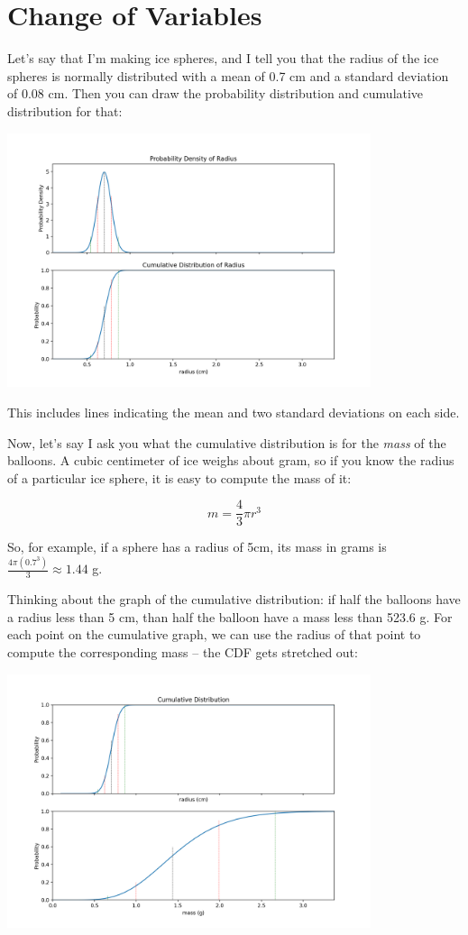 \chapter{Change of Variables}

Let's say that I'm making ice spheres, and I tell you that the radius of the ice spheres is normally distributed with a mean
of 0.7 cm and a standard deviation of 0.08 cm.   Then you can draw the probability distribution and cumulative distribution for that:

\includegraphics[width=0.8\textwidth]{before.png}

This includes lines indicating the mean and two standard deviations on each side.

Now,  let's say I ask you what the cumulative distribution is for the \emph{mass} of the balloons.   A cubic centimeter of ice weighs about gram, so if you know
the radius of a particular ice sphere,  it is easy to compute the mass of it:

$$m = \frac{4}{3} \pi r^3$$

So, for example,  if a sphere has a radius of 5cm,  its mass in grams is  $\frac{4 \pi (0.7^3)}{3}  \approx 1.44$ g.

Thinking about the graph of the cumulative distribution: if half the balloons have a radius less than 5 cm,  than half the balloon have a mass less than 523.6 g.   For each point on the cumulative graph,  we can use the radius of that point to compute the corresponding mass -- the CDF gets stretched out:

\includegraphics[width=0.8\textwidth]{cdf_after.png}

